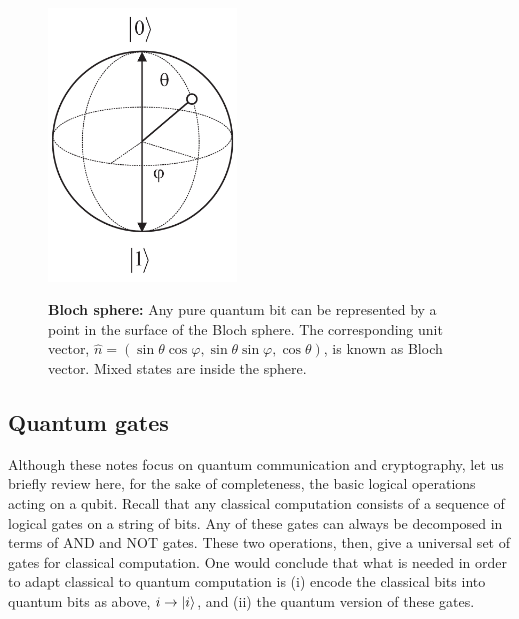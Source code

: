 \documentclass[a4paper]{article}
\begin{document}
\begin{figure}
\begin{center}
  \includegraphics[width=5cm]{qubit}\\
  \caption{\textbf{Bloch sphere:} Any pure quantum bit can be represented
  by a point in the surface of the Bloch sphere. The corresponding
  unit vector, $\hat n=(\sin\theta\cos\varphi,\sin\theta\sin\varphi,
  \cos\theta)$, is known as Bloch vector. Mixed states
  are inside the sphere.}\label{bloch}
\end{center}
\end{figure}


\subsection{Quantum gates}


Although these notes focus on quantum communication and cryptography, let us briefly
review here, for the sake of completeness, the basic logical operations
acting on a qubit. Recall that any classical computation consists of a
sequence of logical gates on a string of bits. Any of these gates
can always be decomposed in terms of AND  and NOT gates. These two
operations, then, give a universal set of gates for classical
computation. One would conclude that what is needed in order to
adapt classical to quantum computation is (i) encode the classical
bits into quantum bits as above, $i\rightarrow|i\rangle$, and (ii)
the quantum version of these gates.
\end{document}
